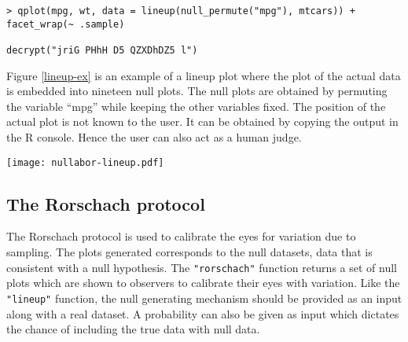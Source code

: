 \begin{verbatim}
> qplot(mpg, wt, data = lineup(null_permute("mpg"), mtcars)) + facet_wrap(~ .sample)

decrypt("jriG PHhH D5 QZXDhDZ5 l")
\end{verbatim}

Figure \ref{lineup-ex} is an example of a lineup plot where the plot of the actual data is embedded into nineteen null plots. The null plots are obtained by permuting the variable ``mpg'' while keeping the other variables fixed. The position of the actual plot is not known to the user. It can be obtained by copying the output in the R console. Hence the user can also act as a human judge. 

\begin{figure*}[hbtp]
\begin{center}
\texttt{[image: nullabor-lineup.pdf]}
\caption{A typical lineup. The plot of the actual data is embedded in a set of null plots which are generated assuming that the null hypothesis is true. The variable ``mpg'' is permuted 19 times to obtain the 19 null plots. Can you identify the plot which has the steepest slope? The true position of the plot can be obtain by copying and pasting ``decrypt(...)'' from the output into R console.}
\label{lineup-ex}
\end{center}
\end{figure*}

\subsection{The Rorschach protocol}\label{the-rorschach-protocol}

The Rorschach protocol is used to calibrate the eyes for variation due
to sampling. The plots generated corresponds to the null datasets, data
that is consistent with a null hypothesis. The \texttt{"rorschach"}
function returns a set of null plots which are shown to observers to
calibrate their eyes with variation. Like the \texttt{"lineup"}
function, the null generating mechanism should be provided as an input
along with a real dataset. A probability can also be given as input
which dictates the chance of including the true data with null data.


